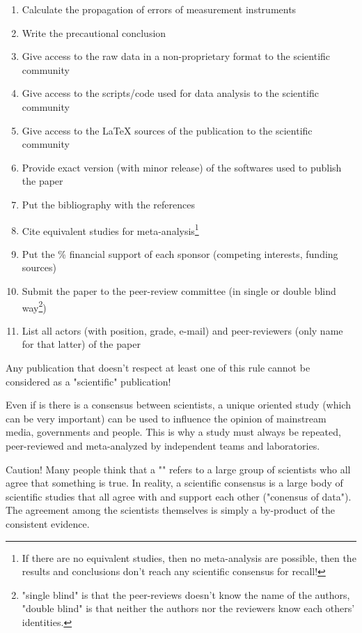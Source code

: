 \begin{enumerate}
		\item Calculate the propagation of errors of measurement instruments
		\item Write the precautional conclusion
		\item Give access to the raw data in a non-proprietary format to the scientific community
		\item Give access to the scripts/code used for data analysis to the scientific community
		\item Give access to the LaTeX sources of the publication to the scientific community
		\item Provide exact version (with minor release) of the softwares used to publish the paper
		\item Put the bibliography with the references
		\item Cite equivalent studies for meta-analysis\footnote{If there are no equivalent studies, then no meta-analysis are possible, then the results and conclusions don't reach any scientific consensus for recall!}
		\item Put the \% financial support of each sponsor (competing interests, funding sources)
		\item Submit the paper to the peer-review committee (in single or double blind way\footnote{"single blind" is that the peer-reviews doesn't know the name of the authors, "double blind" is that neither the authors nor the reviewers know each others' identities.})
		\item List all actors (with position, grade, e-mail) and peer-reviewers (only name for that latter) of the paper
	\end{enumerate}
	Any publication that doesn't respect at least one of this rule cannot be considered as a "scientific" publication!
	\begin{tcolorbox}[title=Remark,colframe=black,arc=10pt]
	Even if is there is a consensus between scientists, a unique oriented study (which can be very important) can be used to influence the opinion of mainstream media, governments and people. This is why a study must always be repeated, peer-reviewed and meta-analyzed by independent teams and laboratories.
	\end{tcolorbox}
	Caution! Many people think that a "" refers to a large group of scientists who all agree that something is true. In reality, a scientific consensus is a large body of scientific studies that all agree with and support each other ("conensus of data"). The agreement among the scientists themselves is simply a by-product of the consistent evidence.
	
